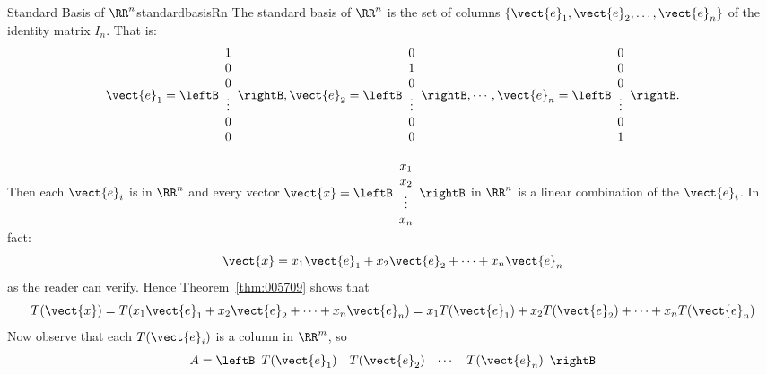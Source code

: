 \begin{definition}{Standard Basis of $\RR^n$}{standardbasisRn}
The standard basis of  $\RR^n$ is the set of columns $\{\vect{e}_{1}, \vect{e}_{2}, \dots, \vect{e}_{n}\}$ of the identity matrix $I_{n}$. That is:
\begin{equation*}
\vect{e}_{1}= \leftB \begin{array}{c} 1 \\ 0  \\ 0 \\ \vdots \\ 0  \\ 0 \end{array} \rightB, 
\vect{e}_{2}= \leftB \begin{array}{c} 0 \\ 1  \\  0 \\ \vdots \\ 0 \\ 0 \end{array} \rightB, 
\cdots ,
\vect{e}_{n}= \leftB \begin{array}{c} 0 \\ 0  \\  0 \\ \vdots \\ 0 \\ 1 \end{array} \rightB.
\end{equation*}
\end{definition}
Then each $\vect{e}_{i}$ is in $\RR^n$ and every vector $\vect{x} = \leftB \begin{array}{c}
x_{1} \\
x_{2} \\
\vdots \\
x_{n}
\end{array} \rightB$
 in $\RR^n$ is a linear combination of the $\vect{e}_{i}$. In fact:
\begin{equation*}
\vect{x} = x_{1}\vect{e}_{1} + x_{2}\vect{e}_{2} + \cdots + x_{n}\vect{e}_{n}
\end{equation*}
as the reader can verify. Hence Theorem~\ref{thm:005709} shows that
\begin{equation*}
T(\vect{x}) = T(x_{1}\vect{e}_{1} + x_{2}\vect{e}_{2} + \cdots + x_{n}\vect{e}_{n}) = x_{1}T(\vect{e}_{1}) + x_{2}T(\vect{e}_{2}) + \cdots + x_{n}T(\vect{e}_{n})
\end{equation*}
Now observe that each $T(\vect{e}_{i})$ is a column in $\RR^m$, so
\begin{equation*}
A = \leftB \begin{array}{cccc}
T(\vect{e}_{1}) & T(\vect{e}_{2}) & \cdots & T(\vect{e}_{n})
\end{array} \rightB
\end{equation*}
